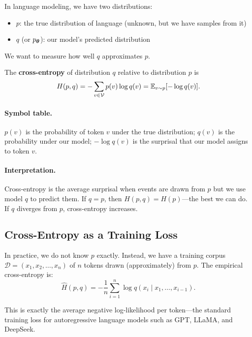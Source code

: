 In language modeling, we have two distributions:
\begin{itemize}
  \item $p$: the true distribution of language (unknown, but we have samples from it)
  \item $q$ (or $p_{\boldsymbol{\theta}}$): our model's predicted distribution
\end{itemize}

We want to measure how well $q$ approximates $p$.

\begin{definition}
\label{def:01:cross_entropy}
The \textbf{cross-entropy} of distribution $q$ relative to distribution $p$ is
\begin{equation}
\label{eq:01:cross_entropy}
H(p, q) = -\sum_{v \in \mathcal{V}} p(v) \log q(v) = \mathbb{E}_{v \sim p}[-\log q(v)].
\end{equation}
\end{definition}

\paragraph{Symbol table.} $p(v)$ is the probability of token $v$ under the true distribution; $q(v)$ is the probability under our model; $-\log q(v)$ is the surprisal that our model assigns to token $v$.

\paragraph{Interpretation.} Cross-entropy is the average surprisal when events are drawn from $p$ but we use model $q$ to predict them. If $q = p$, then $H(p, q) = H(p)$---the best we can do. If $q$ diverges from $p$, cross-entropy increases.

\subsection{Cross-Entropy as a Training Loss}

In practice, we do not know $p$ exactly. Instead, we have a training corpus $\mathcal{D} = (x_1, x_2, \ldots, x_n)$ of $n$ tokens drawn (approximately) from $p$. The empirical cross-entropy is:
\begin{equation}
\label{eq:01:empirical_ce}
\hat{H}(p, q) = -\frac{1}{n} \sum_{i=1}^{n} \log q(x_i \mid x_1, \ldots, x_{i-1}).
\end{equation}

This is exactly the average negative log-likelihood per token---the standard training loss for autoregressive language models such as GPT, LLaMA, and DeepSeek.

